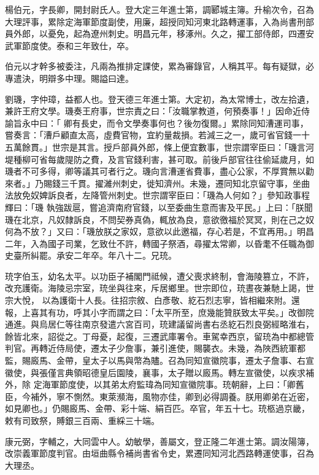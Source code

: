 \begin{pinyinscope}
 楊伯元，字長卿，開封尉氏人。登大定三年進士第，調郾城主簿。升榆次令，召為大理評事，累除定海軍節度副使，用廉，超授同知河東北路轉運事，入為尚書刑部員外郎，以憂免，起為遼州刺史。明昌元年，移涿州。久之，擢工部侍郎，四遷安武軍節度使。泰和三年致仕，卒。



 伯元以才幹多被委注，凡兩為推排定課使，累為審錄官，人稱其平。每有疑獄，必專遣決，明辯多中理。賜謚曰達。



 劉璣，字仲璋，益都人也。登天德三年進士第。大定初，為太常博士，改左拾遺，兼許王府文學。璣奏王府事，世宗責之曰：「汝職掌教道，何預奏事！」因命近侍諭旨永中曰：「
 卿有長史，而令文學奏事何也？後勿復爾。」累除同知漕運司事，嘗奏言：「漕戶顧直太高，虛費官物，宜約量裁損。若減三之一，歲可省官錢一十五萬餘貫。」世宗是其言。授戶部員外郎，條上便宜數事，世宗謂宰臣曰：「璣言河堤種柳可省每歲隄防之費，及言官錢利害，甚可取。前後戶部官往往偷延歲月，如璣者不可多得，卿等議其可者行之。璣向言漕運省費事，盡心公家，不厚賞無以勸來者。」乃賜錢三千貫。擢濰州刺史，徙知濟州。未幾，遷同知北京留守事，坐曲法放免奴婢訴良者，左降管州刺史。世宗謂宰臣曰：「璣為人何如？」參知政事程輝曰：「璣
 執強跋扈，嘗追濟南府官錢，以至委曲生意而害及平民。」上曰：「朕聞璣在北京，凡奴隸訴良，不問契券真偽，輒放為良，意欲徼福於冥冥，則在己之奴何為不放？」又曰：「璣放朕之家奴，意欲以此邀福，存心若是，不宜再用。」明昌二年，入為國子司業，乞致仕不許，轉國子祭酒，尋擢太常卿，以昏耄不任職為御史臺所糾罷。承安二年卒。年八十二。兄珫。



 珫字伯玉，幼名太平。以功臣子補閣門祗候，遭父喪求終制，會海陵篡立，不許，改充護衛。海陵忌宗室，珫坐與往來，斥居鄉里。世宗即位，珫晝夜兼馳上謁，世宗大悅，
 以為護衛十人長。往招宗敘、白彥敬、紇石烈志寧，皆相繼來附。還報，上喜其有功，呼其小字而謂之曰：「太平所至，庶幾能贊朕致太平矣。」改御院通進。與烏居仁等往南京發遣六宮百司，珫建議留尚書右丞紇石烈良弼經略淮右，餘皆北來，詔從之。丁母憂，起復，三遷武庫署令。車駕幸西京，留珫為中都總管判官。再轉近侍局使，遷太子少詹事，兼引進使，賜襲衣。未幾，為陜西統軍都監，賜廄馬、金帶，皇太子以馬與幣為贐。召為同知宣徽院事，遷太子詹事、右宣徽使，與張僅言典領昭德皇后園陵，襄事，太子贈以廄馬。轉左宣徽使，以疾求補外，除
 定海軍節度使，以其弟太府監瑋為同知宣徽院事。珫朝辭，上曰：「卿舊臣，今補外，寧不惻然。東萊瀕海，風物亦佳，卿到必得調養。朕用卿弟在近密，如見卿也。」仍賜廄馬、金帶、彩十端、絹百匹。卒官，年五十七。珫柩過京畿，敕有司致祭，賻銀三百兩、重綵三十端。



 康元弼，字輔之，大同雲中人。幼敏學，善屬文，登正隆二年進士第。調汝陽簿，改崇義軍節度判官。由垣曲縣令補尚書省令史，累遷同知河北西路轉運使事，召為大理丞。




\end{pinyinscope}
